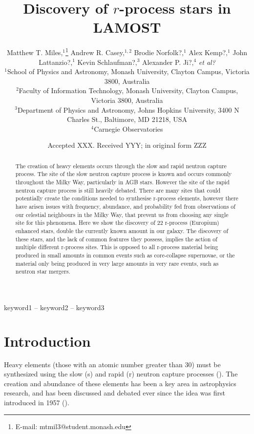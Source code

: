\documentclass[a4paper,fleqn,usenatbib]{mnras}
\title[Discovery of r-process stars in LAMOST]{Discovery of $r$-process stars in LAMOST}
\author[Matthew T. Miles et al.]{Matthew T. Miles,$^{1}$\thanks{E-mail: mtmil3@student.monash.edu}
Andrew R. Casey,$^{1,2}$
Brodie Norfolk?,$^{1}$
Alex Kemp?,$^{1}$\newauthor
John Lattanzio?,$^{1}$
Kevin Schlaufman?,$^{3}$
Alexander P. Ji?,$^{4}$
\emph{et al?}
\\
$^{1}$School of Physics and Astronomy, Monash University, Clayton Campus, Victoria 3800, Australia\\
$^{2}$Faculty of Information Technology, Monash University, Clayton Campus, Victoria 3800, Australia\\
$^{3}$Department of Physics and Astronomy, Johns Hopkins University, 3400 N Charles St., Baltimore, MD 21218, USA\\
$^{4}$Carnegie Observatories
}
\date{Accepted XXX. Received YYY; in original form ZZZ}
\begin{document}
\label{firstpage}
\pagerange{\pageref{firstpage}--\pageref{lastpage}}
\maketitle

\begin{abstract}
The creation of heavy elements occurs through the slow and rapid neutron capture process. The site of the slow neutron capture process is known and occurs commonly throughout the Milky Way, particularly in AGB stars. However the site of the rapid neutron capture process is still heavily debated. There are many sites that could potentially create the conditions needed to synthesise r-process elements, however there have arisen issues with frequency, abundance, and probability fed from observations of our celestial neighbours in the Milky Way, that prevent us from choosing any single site for this phenomena. Here we show the discovery of 22 r-process (Europium) enhanced stars, double the currently known amount in our galaxy. The discovery of these stars, and the lack of common features they possess, implies the action of multiple different r-process sites. This is opposed to all r-process material being produced in small amounts in common events such as core-collapse supernovae, or the material only being produced in very large amounts in very rare events, such as neutron star mergers. 
\end{abstract}

\begin{keywords}
keyword1 -- keyword2 -- keyword3
\end{keywords}


\section{Introduction}

Heavy elements (those with an atomic number greater than 30) must be synthesized using the slow (s) and rapid (r) neutron capture processes (\cite{Sneden2008}). The creation and abundance of these elements has been a key area in astrophysics research, and has been discussed and debated ever since the idea was first introduced in 1957 (\cite{Burbidge1957}). 
\end{document}
